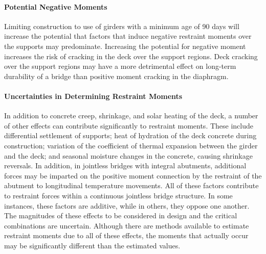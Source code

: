 \paragraph*{Potential Negative Moments}
Limiting construction to use of girders with a minimum age of 90 days will
increase the potential that factors that induce negative restraint moments over the supports may predominate. Increasing the potential for negative moment increases the risk of cracking in the deck over the support regions. Deck cracking over the support regions may have a more detrimental effect on long-term durability of a bridge than positive moment cracking in the diaphragm.


\paragraph*{Uncertainties in Determining Restraint Moments}
In addition to concrete creep, shrinkage, and solar heating of the deck, a number of other effects can contribute significantly to restraint moments. These include differential settlement of supports; heat of hydration of the deck concrete during construction; variation of the coefficient of thermal expansion between the girder and the deck; and seasonal moisture changes in the concrete, causing shrinkage reversals. In addition, in jointless bridges with integral abutments, additional forces may be imparted on the positive moment connection by the restraint of the abutment to longitudinal temperature movements. All of these factors contribute to restraint forces within a continuous jointless bridge structure. In some instances, these factors are additive, while in others, they oppose one another. The magnitudes of these effects to be considered in design and the critical combinations are uncertain. Although there are methods available to estimate restraint moments due to all of these effects, the moments that actually occur may be significantly different than the estimated values.

